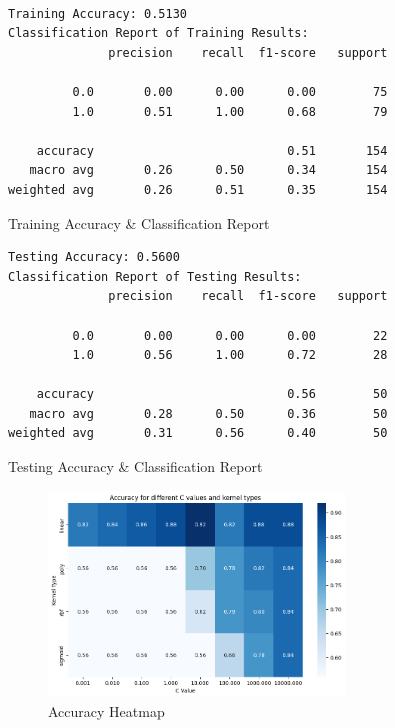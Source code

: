 \documentclass[a4paper, 10pt]{article}
\newenvironment{code}{\captionsetup{type=listing}}{}
\begin{document}
\begin{minipage}{0.45\textwidth} 
\begin{code}
\begin{verbatim}

Training Accuracy: 0.5130
Classification Report of Training Results:
              precision    recall  f1-score   support

         0.0       0.00      0.00      0.00        75
         1.0       0.51      1.00      0.68        79

    accuracy                           0.51       154
   macro avg       0.26      0.50      0.34       154
weighted avg       0.26      0.51      0.35       154
\end{verbatim}
\caption{Training Accuracy \& Classification Report}
\end{code}
\begin{code}
\begin{verbatim}
Testing Accuracy: 0.5600
Classification Report of Testing Results:
              precision    recall  f1-score   support

         0.0       0.00      0.00      0.00        22
         1.0       0.56      1.00      0.72        28

    accuracy                           0.56        50
   macro avg       0.28      0.50      0.36        50
weighted avg       0.31      0.56      0.40        50
\end{verbatim}
\caption{Testing Accuracy \& Classification Report}
\end{code}
\end{minipage}


\begin{figure}[H]
    \centering
    \includegraphics[width=0.7\textwidth]{./images/svc_heatmap.png}
    \caption{Accuracy Heatmap}
\end{figure}
\end{document}
